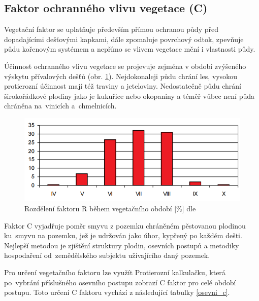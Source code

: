 \subsection{Faktor ochranného vlivu vegetace (C)}
Vegetační faktor se uplatňuje především přímou ochranou půdy před
dopadajícími dešťovými kapkami, dále zpomaluje povrchový odtok,
zpevňuje půdu kořenovým systémem a nepřímo se vlivem vegetace mění i
vlastnosti půdy.

Účinnost ochranného vlivu vegetace se projevuje zejména v období
zvýšeného výskytu přívalových dešťů
(obr. \ref{fig:r_faktor_graph}). Nejdokonaleji půdu chrání les,
vysokou protierozní účinnost mají též traviny a
jeteloviny. Nedostatečně půdu chrání širokořádkové plodiny jako je
kukuřice nebo okopaniny a téměř vůbec není půda chráněna na~vinicích a~chmelnicích.
\begin{figure}[H]
    \centering
    \includegraphics[scale=0.8]{./pictures/r_factor_graph.png}
      \caption[Rozdělení faktoru R během vegetačního období]{Rozdělení
        faktoru R během vegetačního období [\%] dle
        \cite{janecek2012}}
      \label{fig:r_faktor_graph}
\end{figure}
Faktor C vyjadřuje poměr smyvu z pozemku chráněném
pěstovanou plodinou ku~smyvu na pozemku, jež je udržován jako úhor,
kypřený po každém dešti. Nejlepší metodou je zjištění struktury
plodin, osevních postupů a metodiky hospodaření od~zemědělského
subjektu užívajícího daný pozemek.

Pro určení vegetačního faktoru lze využít Protierozní
kalkulačku\cite{kalkulacka}, která po~vybrání příslušného osevního
postupu zobrazí C faktor pro celé období postupu. Toto určení C faktoru vychází z následující tabulky \ref{osevni_c}.

